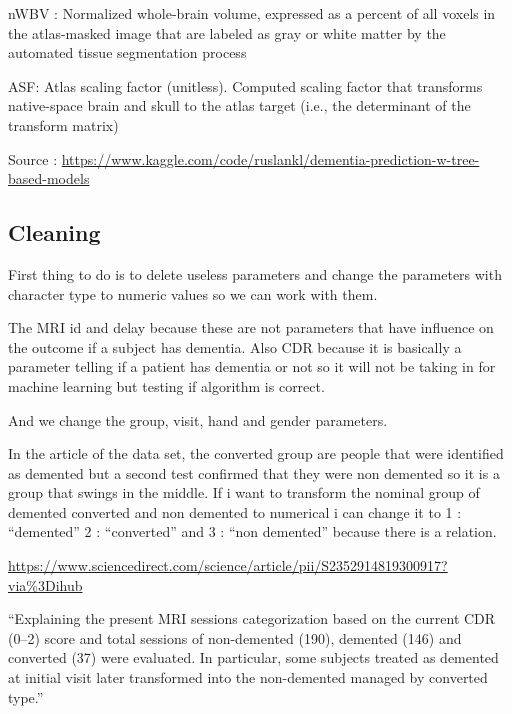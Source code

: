 \documentclass[
]{article}
\begin{document}
nWBV : Normalized whole-brain volume, expressed as a percent of all
voxels in the atlas-masked image that are labeled as gray or white
matter by the automated tissue segmentation process

ASF: Atlas scaling factor (unitless). Computed scaling factor that
transforms native-space brain and skull to the atlas target (i.e., the
determinant of the transform matrix)

Source :
\url{https://www.kaggle.com/code/ruslankl/dementia-prediction-w-tree-based-models}

\hypertarget{cleaning}{%
\subsection{Cleaning}\label{cleaning}}

First thing to do is to delete useless parameters and change the
parameters with character type to numeric values so we can work with
them.

The MRI id and delay because these are not parameters that have
influence on the outcome if a subject has dementia. Also CDR because it
is basically a parameter telling if a patient has dementia or not so it
will not be taking in for machine learning but testing if algorithm is
correct.

And we change the group, visit, hand and gender parameters.

In the article of the data set, the converted group are people that were
identified as demented but a second test confirmed that they were non
demented so it is a group that swings in the middle. If i want to
transform the nominal group of demented converted and non demented to
numerical i can change it to 1 : ``demented'' 2 : ``converted'' and 3 :
``non demented'' because there is a relation.

\url{https://www.sciencedirect.com/science/article/pii/S2352914819300917?via\%3Dihub}

``Explaining the present MRI sessions categorization based on the
current CDR (0--2) score and total sessions of non-demented (190),
demented (146) and converted (37) were evaluated. In particular, some
subjects treated as demented at initial visit later transformed into the
non-demented managed by converted type.''
\end{document}

